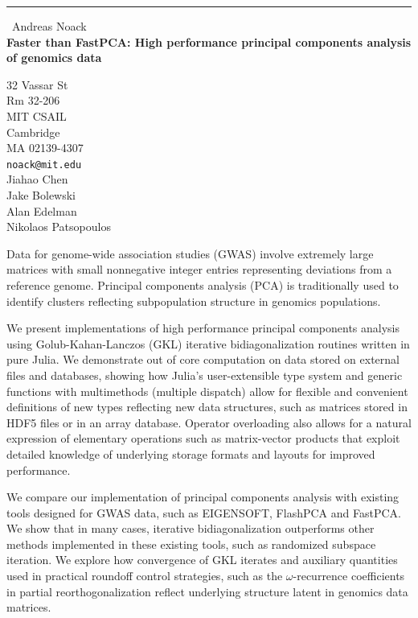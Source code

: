 \documentclass{report}
\begin{document}
\begin{center}
\rule{6in}{1pt} \
{\large Andreas Noack \\
{\bf Faster than FastPCA: High performance principal components analysis of genomics data}}

32 Vassar St \\ Rm 32-206 \\ MIT CSAIL \\ Cambridge \\ MA 02139-4307
\\
{\tt noack@mit.edu}\\
Jiahao Chen\\
Jake Bolewski\\
Alan Edelman\\
Nikolaos Patsopoulos\end{center}

Data for genome-wide association studies (GWAS) involve extremely large matrices
with small nonnegative integer entries representing deviations from a reference
genome. Principal components analysis (PCA) is traditionally used to identify
clusters reflecting subpopulation structure in genomics populations.

We present implementations of high performance principal components analysis using
Golub-Kahan-Lanczos (GKL) iterative bidiagonalization routines written in pure Julia.
We demonstrate out of core computation on data stored on external files and databases,
showing how Julia's user-extensible type system and generic functions with
multimethods (multiple dispatch) allow for flexible and convenient
definitions of new types reflecting new data structures, such as matrices stored
in HDF5 files or in an array database. Operator overloading also allows for a
natural expression of elementary operations such as matrix-vector products that
exploit detailed knowledge of underlying storage formats and layouts for improved
performance.

We compare our implementation of principal components analysis with existing
tools designed for GWAS data, such as EIGENSOFT, FlashPCA and FastPCA. We show
that in many cases, iterative bidiagonalization outperforms other methods
implemented in these existing tools, such as randomized subspace iteration.
We explore how convergence of GKL iterates and auxiliary quantities used in
practical roundoff control strategies, such as the $\omega$-recurrence coefficients
in partial reorthogonalization reflect underlying structure latent in genomics
data matrices.
\end{document}
